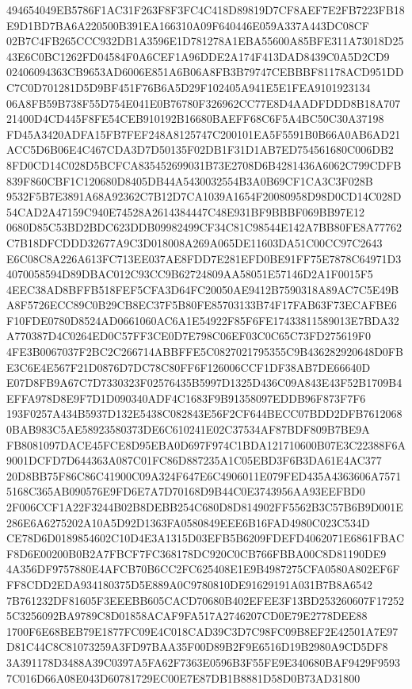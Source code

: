 \documentclass[UTF8,fontset=fandol,zihao=-4,a4paper]{ctexart}
\begin{document}
{{494654049EB5786F1AC31F263F8F3FC4C418D89819D7CF8AEF7E2FB7223FB18E9D1BD7BA6A220500B391EA166310A09F640446E059A337A443DC08CF
02B7C4FB265CCC932DB1A3596E1D781278A1EBA55600A85BFE311A73018D2543E6C0BC1262FD04584F0A6CEF1A96DDE2A174F413DAD8439C0A5D2CD9
02406094363CB9653AD6006E851A6B06A8FB3B79747CEBBBF81178ACD951DDC7C0D701281D5D9BF451F76B6A5D29F102405A941E5E1FEA9101923134
06A8FB59B738F55D754E041E0B76780F326962CC77E8D4AADFDDD8B18A70721400D4CD445F8FE54CEB910192B16680BAEFF68C6F5A4BC50C30A37198
FD45A3420ADFA15FB7FEF248A8125747C200101EA5F5591B0B66A0AB6AD21ACC5D6B06E4C467CDA3D7D50135F02DB1F31D1AB7ED754561680C006DB2
8FD0CD14C028D5BCFCA835452699031B73E2708D6B4281436A6062C799CDFB839F860CBF1C120680D8405DB44A5430032554B3A0B69CF1CA3C3F028B
9532F5B7E3891A68A92362C7B12D7CA1039A1654F20080958D98D0CD14C028D54CAD2A47159C940E74528A2614384447C48E931BF9BBBF069BB97E12
0680D85C53BD2BDC623DDB09982499CF34C81C98544E142A7BB80FE8A77762C7B18DFCDDD32677A9C3D018008A269A065DE11603DA51C00CC97C2643
E6C08C8A226A613FC713EE037AE8FDD7E281EFD0BE91FF75E7878C64971D34070058594D89DBAC012C93CC9B62724809AA58051E57146D2A1F0015F5
4EEC38AD8BFFB518FEF5CFA3D64FC20050AE9412B7590318A89AC7C5E49BA8F5726ECC89C0B29CB8EC37F5B80FE85703133B74F17FAB63F73ECAFBE6
F10FDE0780D8524AD0661060AC6A1E54922F85F6FE17433811589013E7BDA32A770387D4C0264ED0C57FF3CE0D7E798C06EF03C0C65C73FD275619F0
4FE3B0067037F2BC2C266714ABBFFE5C0827021795355C9B436282920648D0FBE3C6E4E567F21D0876D7DC78C80FF6F126006CCF1DF38AB7DE66640D
E07D8FB9A67C7D7330323F02576435B5997D1325D436C09A843E43F52B1709B4EFFA978D8E9F7D1D090340ADF4C1683F9B91358097EDDB96F873F7F6
193F0257A434B5937D132E5438C082843E56F2CF644BECC07BDD2DFB76120680BAB983C5AE58923580373DE6C610241E02C37534AF87BDF809B7BE9A
FB8081097DACE45FCE8D95EBA0D697F974C1BDA121710600B07E3C22388F6A9001DCFD7D644363A087C01FC86D887235A1C05EBD3F6B3DA61E4AC377
20D8BB75F86C86C41900C09A324F647E6C4906011E079FED435A4363606A75715168C365AB090576E9FD6E7A7D70168D9B44C0E3743956AA93EEFBD0
2F006CCF1A22F3244B02B8DEBB254C680D8D814902FF5562B3C57B6B9D001E286E6A6275202A10A5D92D1363FA0580849EEE6B16FAD4980C023C534D
CE78D6D0189854602C10D4E3A1315D03EFB5B6209FDEFD4062071E6861FBACF8D6E00200B0B2A7FBCF7FC368178DC920C0CB766FBBA00C8D81190DE9
4A356DF9757880E4AFCB70B6CC2FC625408E1E9B4987275CFA0580A802EF6FFF8CDD2EDA934180375D5E889A0C9780810DE91629191A031B7B8A6542
7B761232DF81605F3EEEBB605CACD70680B402EFEE3F13BD253260607F172525C3256092BA9789C8D01858ACAF9FA517A2746207CD0E79E2778DEE88
1700F6E68BEB79E1877FC09E4C018CAD39C3D7C98FC09B8EF2E42501A7E97D81C44C8C81073259A3FD97BAA35F00D89B2F9E6516D19B2980A9CD5DF8
3A391178D3488A39C0397A5FA62F7363E0596B3F55FE9E340680BAF9429F95937C016D66A08E043D60781729EC00E7E87DB1B8881D58D0B73AD31800
}}
\end{document}
